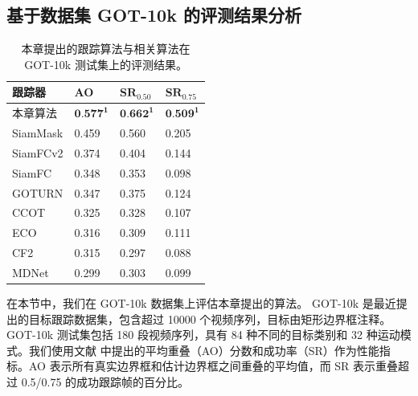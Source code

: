 
\subsection{基于数据集 GOT-10k 的评测结果分析}
\begin{table}[t]
\centering
\caption{本章提出的跟踪算法与相关算法在 GOT-10k \cite{GOT-10k} 测试集上的评测结果。}
\begin{tabular}{l l l l}
\bottomrule
跟踪器   &  AO   &  $\textbf{SR}_{0.50}$ & $\textbf{SR}_{0.75}$  \\
\hline
本章算法 &  $\textbf{0.577}^\textbf{1}$ & $\textbf{0.662}^\textbf{1}$  & $\textbf{0.509}^\textbf{1}$  \\
SiamMask \cite{Wang2018SiamMask} &  0.459&  0.560 &0.205 \\
SiamFCv2 \cite{valmadre2017end} &  0.374&  0.404 &0.144 \\
SiamFC \cite{SiamFC}  &  0.348&  0.353 &0.098 \\
GOTURN \cite{GOTURN} &  0.347&  0.375 &0.124 \\
CCOT	 \cite{danelljan2016beyond} &  0.325&  0.328 &0.107 \\
ECO \cite{danelljan2017eco} &  0.316&  0.309 &0.111 \\
CF2 \cite{CF2} &  0.315&  0.297 &0.088 \\
MDNet \cite{MDNet} &  0.299&  0.303 &0.099 \\
\bottomrule
\end{tabular}
\label{table:end_got10k}
\end{table}
在本节中，我们在 GOT-10k \cite{GOT-10k} 数据集上评估本章提出的算法。
GOT-10k 是最近提出的目标跟踪数据集，包含超过 10000 个视频序列，目标由矩形边界框注释。
GOT-10k 测试集包括 180 段视频序列，具有 84 种不同的目标类别和 32 种运动模式。我们使用文献 \cite{GOT-10k} 中提出的平均重叠（AO）分数和成功率（SR）作为性能指标。AO 表示所有真实边界框和估计边界框之间重叠的平均值，而 SR 表示重叠超过 0.5/0.75 的成功跟踪帧的百分比。

